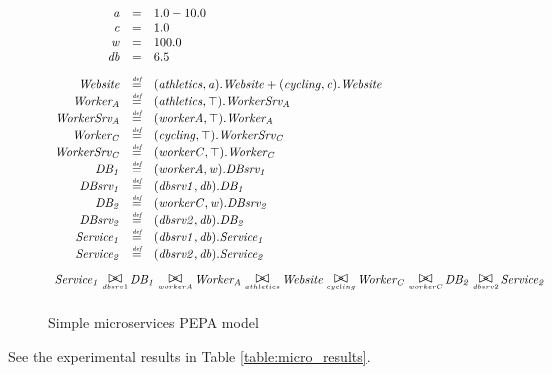 \begin{figure}
	\caption{Simple microservices PEPA model}
	\label{figure:simplemicro}
	\centering
	\begin{displaymath}
		\begin{array}{rcl}
			\mathit{a} & = & 1.0 - 10.0\\
			\mathit{c} & = & 1.0\\
			\mathit{w} & = & 100.0\\
			\mathit{db} & = & 6.5\\
			[2.0ex]		\mathit{Website} & \rmdef & (\mathit{athletics},\mathit{a}).\mathit{Website}+(\mathit{cycling},\mathit{c}).\mathit{Website}\\
			\mathit{Worker_A} & \rmdef & (\mathit{athletics},\top).\mathit{WorkerSrv_A}\\
			\mathit{WorkerSrv_A} & \rmdef & (\mathit{workerA},\top).\mathit{Worker_A}\\
			\mathit{Worker_C} & \rmdef & (\mathit{cycling},\top).\mathit{WorkerSrv_C}\\
			\mathit{WorkerSrv_C} & \rmdef & (\mathit{workerC},\top).\mathit{Worker_C}\\
			\mathit{DB_1} & \rmdef & (\mathit{workerA},\mathit{w}).\mathit{DBsrv_1}\\
			\mathit{DBsrv_1} & \rmdef & (\mathit{dbsrv1},\mathit{db}).\mathit{DB_1}\\
			\mathit{DB_2} & \rmdef & (\mathit{workerC},\mathit{w}).\mathit{DBsrv_2}\\
			\mathit{DBsrv_2} & \rmdef & (\mathit{dbsrv2},\mathit{db}).\mathit{DB_2}\\
			\mathit{Service_1} & \rmdef & (\mathit{dbsrv1},\mathit{db}).\mathit{Service_1}\\
			\mathit{Service_2} & \rmdef & (\mathit{dbsrv2},\mathit{db}).\mathit{Service_2}\\
			[2.0ex]		\multicolumn{3}{l}{\mathit{Service_1}\sync{dbsrv1}\mathit{DB_1}\sync{workerA}\mathit{Worker_A}\sync{athletics}\mathit{Website}\sync{cycling}\mathit{Worker_C}\sync{workerC}\mathit{DB_2}\sync{dbsrv2}\mathit{Service_2}}\\
			[2.0ex]	\end{array}
	\end{displaymath}
\end{figure}

See the experimental results in Table \ref{table:micro_results}.

